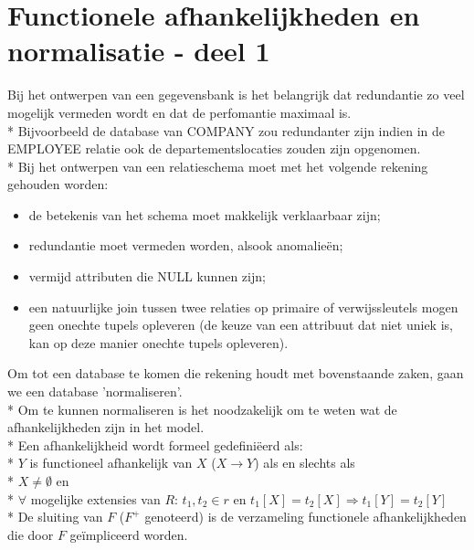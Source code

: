\documentclass[10pt]{article}
\begin{document}
\section{Functionele afhankelijkheden en normalisatie - deel 1}
Bij het ontwerpen van een gegevensbank is het belangrijk dat redundantie zo veel mogelijk vermeden wordt en dat de perfomantie maximaal is.\\*
Bijvoorbeeld de database van COMPANY zou redundanter zijn indien in de EMPLOYEE relatie ook de departementslocaties zouden zijn opgenomen.\\*
Bij het ontwerpen van een relatieschema moet met het volgende rekening gehouden worden:
\begin{itemize}
\item de betekenis van het schema moet makkelijk verklaarbaar zijn;
\item redundantie moet vermeden worden, alsook anomalie\"en;
\item vermijd attributen die NULL kunnen zijn;
\item een natuurlijke join tussen twee relaties op primaire of verwijssleutels mogen geen onechte tupels opleveren (de keuze van een attribuut dat niet uniek is, kan op deze manier onechte tupels opleveren).
\end{itemize}
Om tot een database te komen die rekening houdt met bovenstaande zaken, gaan we een database 'normaliseren'.\\*
Om te kunnen normaliseren is het noodzakelijk om te weten wat de afhankelijkheden zijn in het model.\\*
Een afhankelijkheid wordt formeel gedefini\"eerd als:\\*
$Y$ is functioneel afhankelijk van $X$ ($X \rightarrow Y$) als en slechts als\\*
$X \ne \emptyset$ en\\*
$\forall$ mogelijke extensies van $R$: $t_1, t_2 \in r$ en $t_1[X] = t_2[X] \Rightarrow t_1[Y] = t_2[Y]$\\*
De sluiting van $F$ ($F^+$ genoteerd) is de verzameling functionele afhankelijkheden die door $F$ ge\"impliceerd worden.
\end{document}
